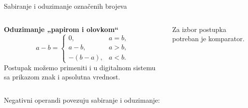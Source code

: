 \begin{frame}[label=05-s021]{Sabiranje i oduzimanje označenih brojeva}
\begin{columns}[t,onlytextwidth]
\textbf{Oduzimanje „papirom i olovkom“}
\[a-b=\begin{cases}0,&a=b,\\a-b,&a>b,\\-(b-a),&a<b.\end{cases}\]
Postupak možemo primeniti i u digitalnom sistemu sa prikazom znak i apsolutna vrednost.\par\medskip
Za izbor postupka potreban je komparator.
\end{columns}
\medskip
Negativni operandi povezuju sabiranje i oduzimanje:
\begin{center}\end{center}
\end{frame}
